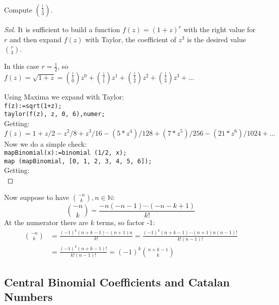 \begin{exercise}
  \label{exercise:first-on-comb-with-real}
  Compute ${{ \frac{1}{2} }\choose{3}} $.
\end{exercise}
\begin{proof}[Sol]
  It is sufficient to build a function $f(z) = (1+z)^r$ with the right
  value for $r$ and then expand $f(z)$ with Taylor, the coefficient of
  $z^3$ is the desired value ${{ r }\choose{3}} $.
  
  In this case $r= \frac{1}{2} $, so $f(z) = \sqrt{1+z} =
  {{\frac{1}{2}}\choose{0}}z^0 + {{\frac{1}{2}}\choose{1}}z^1 +
  {{\frac{1}{2}}\choose{2}}z^2 + {{\frac{1}{2}}\choose{3}}z^3 + \ldots$

  Using Maxima we expand with Taylor:
  \\\texttt{f(z):=sqrt(1+z);\\taylor(f(z), z, 0, 6),numer;}\\
  Getting:
  \begin{displaymath}
    f(z) = 1+z/2-z^2/8+z^3/16-(5*z^4)/128+(7*z^5)/256-(21*z^6)/1024+...
  \end{displaymath}
  Now we do a simple check:
  \\\texttt{mapBinomial(x):=binomial (1/2, x);\\
    map (mapBinomial, [0, 1, 2, 3, 4, 5, 6]);}\\
  Getting:
  \begin{displaymath}
    [1,1/2,-1/8,1/16,-5/128,7/256,-21/1024]
  \end{displaymath}
\end{proof}

Now suppose to have ${{-n}\choose{k}}, n\in \mathbb{N}  $:
\begin{displaymath}
  {{-n}\choose{k}} =  \frac{-n(-n-1)\cdots(-n-k+1)}{k!} 
\end{displaymath}
At the numerator there are $k$ terms, so factor -1:
\begin{displaymath}
  \begin{split}
    {{-n}\choose{k}} &= \frac{(-1)^k (n + k-1)\cdots(n+1)n}{k!} =
    \frac{(-1)^k (n + k-1)\cdots(n+1)n(n-1)!}{k!(n-1)!}\\
    &= \frac{(-1)^k (n + k-1)!}{k!(n-1)!} = (-1)^k {{n+k-1}\choose{k}}
  \end{split}
\end{displaymath}

\subsection{Central Binomial Coefficients and Catalan Numbers}


